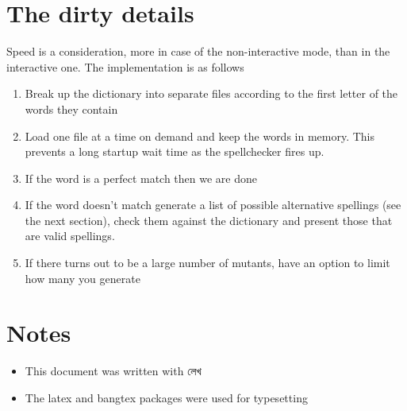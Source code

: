 \documentclass[11pt]{article}
\begin{document}
\section{The dirty details}
Speed is a consideration, more in case of the non-interactive mode, than in the interactive one. The implementation is as follows

\begin{enumerate}
\item Break up the dictionary into separate files according to the first letter of the words they contain
\item Load one file at a time on demand and keep the words in memory. This prevents a long startup wait time as the spellchecker fires up.
\item If the word is a perfect match then we are done
\item If the word doesn't match generate a list of possible alternative spellings (see the next section), check them against the dictionary and present those that are valid spellings.
\item If there turns out to be  a large number of mutants, have an option to limit how many you generate
\end{enumerate}

\section{Notes}
\begin{itemize}
\item This document was written with {\lbng লেখ}
\item The latex and bangtex packages were used for typesetting
\end{itemize}
\end{document}
